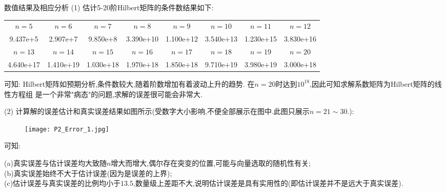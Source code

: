 \documentclass{article}
\begin{document}
\begin{section}{数值结果及相应分析}
\noindent(1) 估计5-20阶Hilbert矩阵的条件数结果如下:
\begin{table}[htbp!]
    \begin{tabular}{cccccccc}
    \hline
    $n=5$         & $n=6$         & $n=7$         & $n=8$        & $n=9$         & $n=10 $       & $n=11$        & $n=12 $       \\
    9.437e+5  & 2.907e+7  & 9.850e+8  & 3.390e+10 & 1.100e+12 & 3.540e+13 & 1.230e+15 & 3.830e+16 \\ \hline
    $n=13$        & $n=14$        & $n=15$        & $n=16$        & $n=17 $       & $n=18$        & $n=19$        & $n=20$        \\
    4.640e+17 & 1.410e+19 & 1.030e+18 & 1.970e+18 & 1.850e+18 & 9.710e+19 & 3.980e+19 & 3.000e+18\\\hline
    \end{tabular}
    \end{table}

可知: Hilbert矩阵如预期分析,条件数较大,随着阶数增加有着波动上升的趋势.
在$n=20$时达到$10^{18}$,因此可知求解系数矩阵为Hilbert矩阵的线性方程组
是一个非常"病态"的问题,求解的误差很可能会非常大.

\noindent(2)
计算解的误差估计和真实误差结果如图所示(受数字大小影响,不便全部展示在图中.此图只展示$n=21\sim 30$.):
\begin{figure}[htbp!]
    \texttt{[image: P2\_Error\_1.jpg]}
\end{figure}

可知:

\noindent(a)真实误差与估计误差均大致随$n$增大而增大,偶尔存在突变的位置,可能与向量选取的随机性有关;\\
(b)真实误差始终不大于估计误差(因为是误差的上界);\\
(c)估计误差与真实误差的比例均小于$13.5$,数量级上差距不大,说明估计误差是具有实用性的(即估计误差并不是远大于真实误差).

\end{section}
\end{document}
